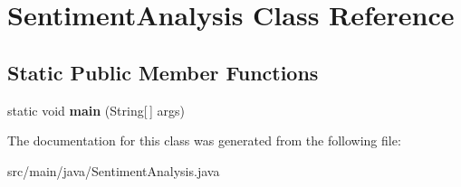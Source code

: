 \hypertarget{classSentimentAnalysis}{}\section{Sentiment\+Analysis Class Reference}
\label{classSentimentAnalysis}
\subsection*{Static Public Member Functions}
\begin{DoxyCompactItemize}
\item 
\mbox{\label{classSentimentAnalysis_addff76cd1ed30e2119285b52bd15a098}} 
static void {\bfseries main} (String\mbox{[}$\,$\mbox{]} args)
\end{DoxyCompactItemize}


The documentation for this class was generated from the following file\+:\begin{DoxyCompactItemize}
\item 
src/main/java/Sentiment\+Analysis.\+java\end{DoxyCompactItemize}
